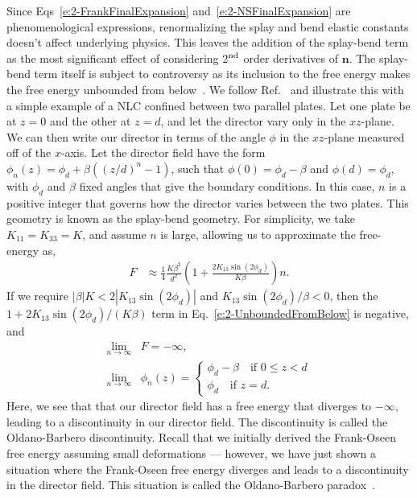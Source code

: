 Since Eqs~\ref{e:2-FrankFinalExpansion} and~\ref{e:2-NSFinalExpansion} are phenomenological expressions, renormalizing the splay and bend elastic constants doesn't affect underlying physics.
This leaves the addition of the splay-bend term as the most significant effect of considering 2$^\textup{\rm nd}$ order derivatives of $\mathbf{n}$.
The splay-bend term itself is subject to controversy as its inclusion to the free energy makes the free energy unbounded from below~\cite{RN214,RN215,RN216}.
We follow Ref.~\cite{RN219} and illustrate this with a simple example of a NLC confined between two parallel plates.
Let one plate be at $z = 0$ and the other at $z=d$, and let the director vary only in the $xz$-plane.
We can then write our director in terms of the angle $\phi$ in the $xz$-plane measured off of the $x$-axis.
Let the director field have the form $\phi_n(z) = \phi_d + \beta ((z/d)^n-1)$, such that $\phi(0) = \phi_d - \beta$ and $\phi(d) = \phi_d$, with $\phi_d$ and $\beta$ fixed angles that give the boundary conditions.
In this case, $n$ is a positive integer that governs how the director varies between the two plates.
This geometry is known as the splay-bend geometry.
For simplicity, we take $K_{11} = K_{33} = K$, and assume $n$ is large, allowing us to approximate the free-energy as,
\begin{align}
  F &\approx \frac{1}{4}\frac{K \beta^2}{d^2} \left ( 1 + \frac{2 K_{13} \sin(2 \phi_d)}{K \beta}  \right) n.\label{e:2-UnboundedFromBelow}
\end{align}
If we require $|\beta|K < 2| K_{13} \sin(2 \phi_d)| $ and $K_{13} \sin(2 \phi_d)/\beta < 0$, then the \\ $1 + 2 K_{13} \sin(2 \phi_d)/(K \beta) $ term in Eq.~\ref{e:2-UnboundedFromBelow} is negative, and
\begin{align}
  \lim_{n\to\infty} &F = -\infty, \\
  \lim_{n\to\infty} &\phi_n(z) =
  \begin{cases}
    \phi_d - \beta \quad \textrm{if }  0 \leq z  < d \\
    \phi_d \quad \textrm{if } z = d.
  \end{cases}
\end{align}
Here, we see that that our director field has a free energy that diverges to $- \infty$, leading to a discontinuity in our director field.
The discontinuity is called the Oldano-Barbero discontinuity.
Recall that we initially derived the Frank-Oseen free energy assuming small deformations --- however, we have just shown a situation where the Frank-Oseen free energy diverges and leads to a discontinuity in the director field.
This situation is called the Oldano-Barbero paradox~\cite{RN216,RN220,RN219,RN221}.

